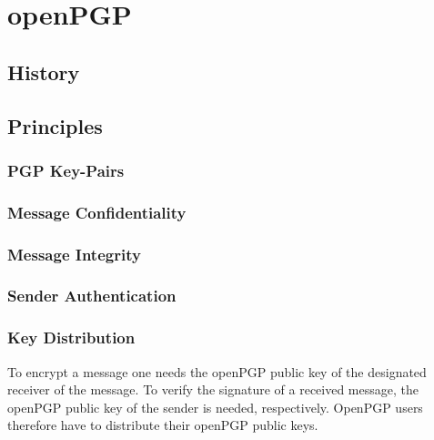 \chapter{openPGP} \label{chapter:openpgp}


\section{History}

\section{Principles} \label{section:openpgp:principles}


\subsection{PGP Key-Pairs} \label{section:openpgp:keys}

\subsection{Message Confidentiality} \label{section:openpgp:confidentiality}


\subsection{Message Integrity} \label{section:openpgp:integrity}


\subsection{Sender Authentication} \label{section:openpgp:authentication}




\subsection{Key Distribution} \label{section:openpgp:keydistributio}

To encrypt a message one needs the openPGP public key of the designated receiver of the message.
To verify the signature of a received message, the openPGP public key of the sender is needed, respectively.
OpenPGP users therefore have to distribute their openPGP public keys.

